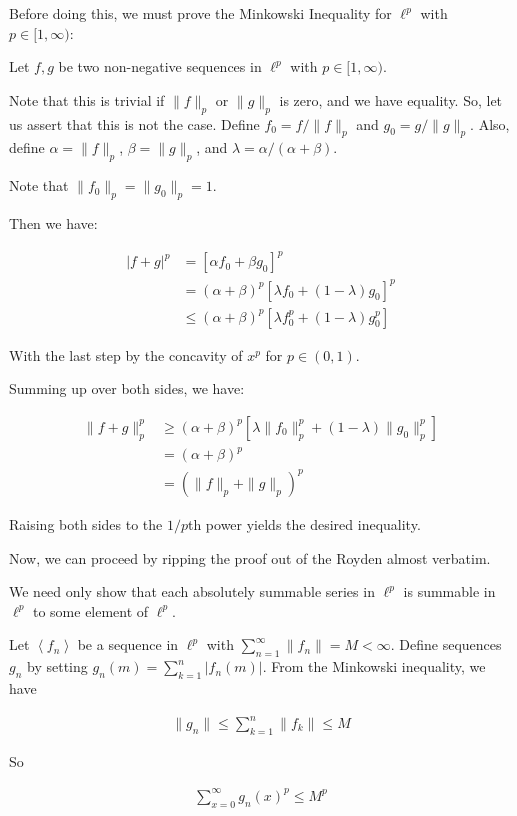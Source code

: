 \documentclass[a4paper,12pt]{article}
\newcommand{\tab}{\hspace{4mm}} %
\newcommand{\absval}[1]{\left\lvert #1 \right\rvert}
\newcommand{\norm}[1]{\|#1\|}
\newcommand{\anbrack}[1]{\left\langle #1 \right\rangle}
\newcommand{\al}{\alpha} %
\newcommand{\be}{\beta}
\newcommand{\la}{\lambda}
\begin{document}
Before doing this, we must prove the Minkowski Inequality for $\ell^p$ with $p \in [1,\infty)$:

\tab Let $f,g$ be two non-negative sequences in $\ell^p$ with $p \in [1,\infty)$.

\tab Note that this is trivial if $\norm{f}_p$ or $\norm{g}_p$ is zero, and we have equality. So, let us assert that this is not the case. Define $f_0=f/\norm{f}_p$ and $g_0=g/\norm{g}_p$. Also, define $\al = \norm{f}_p$, $\be=\norm{g}_p$, and $\la = \al/(\al+\be)$.

\tab Note that $\norm{f_0}_p=\norm{g_0}_p=1$.

\tab Then we have:

\begin{align*}
\absval{f+g}^p &= [\al f_0 + \be g_0]^p\\
&= (\al+\be)^p[\la f_0 + (1-\la) g_0]^p\\
&\leq (\al+\be)^p[\la f_0^p + (1-\la) g_0^p]
\end{align*}

\tab With the last step by the concavity of $x^p$ for $p \in (0,1)$.

\tab Summing up over both sides, we have:

\begin{align*}
\norm{f+g}_p^p &\geq (\al+\be)^p[\la \norm{f_0}_p^p+(1-\la)\norm{g_0}_p^p]\\
&=(\al+\be)^p\\
&=(\norm{f}_p+\norm{g}_p)^p
\end{align*}

\tab Raising both sides to the $1/p$th power yields the desired inequality. 

Now, we can proceed by ripping the proof out of the Royden almost verbatim.

\tab We need only show that each absolutely summable series in $\ell^p$ is summable in $\ell^p$ to some element of $\ell^p$.

\tab Let $\anbrack{f_n}$ be a sequence in $\ell^p$ with $\sum\limits_{n=1}^\infty \norm{f_n} = M < \infty$. Define sequences $g_n$ by setting $g_n(m) = \sum\limits_{k=1}^n \absval{f_n(m)}$. From the Minkowski inequality, we have

\begin{align*}
\norm{g_n} \leq \sum\limits_{k=1}^n \norm{f_k} \leq M
\end{align*}

So

\begin{align*}
\sum\limits_{x=0}^\infty g_n(x)^p \leq M^p
\end{align*}
\end{document}

